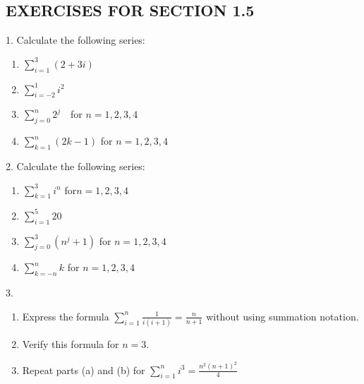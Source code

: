 \documentclass[10pt,]{book}
\theoremstyle{plain}
\theoremstyle{definition}
\begin{document}
\typeout{************************************************}
\typeout{************************************************}
\subsection[EXERCISES FOR SECTION 1.5 ]{EXERCISES FOR SECTION 1.5 }\label{exercises-1.5}
\hypertarget{exercisegroup-9}{}\begin{exercisegroup}
\item[1.]\hypertarget{exercise-32}{} 
Calculate the following series:
\leavevmode%
\begin{enumerate}[label=(\alph*)]
\item\hypertarget{li-175}{}  \(\sum _{i=1}^3 (2 + 3i)\)\item\hypertarget{li-176}{}  \(\sum _{i=-2}^1 i^2\) \item\hypertarget{li-177}{}  \(\sum _{j=0}^n 2^j\text{   }\) for \(n= 1, 2, 3, 4\)\item\hypertarget{li-178}{}  \(\sum _{k=1}^n (2k-1)\) for \(n = 1, 2, 3, 4\) \end{enumerate}
\par\smallskip
\item[2.]\hypertarget{exercise-33}{} Calculate the following series: 
\leavevmode%
\begin{enumerate}[label=(\alph*)]
\item\hypertarget{li-179}{}  \(\sum _{k=1}^3 i^n\) for\(n = 1, 2, 3, 4\) \item\hypertarget{li-180}{}  \(\sum _{i=1}^5 20\) \item\hypertarget{li-181}{}   \(\sum _{j=0}^3 \left(n^j+1\right)\) for \(n = 1, 2, 3,4\) \item\hypertarget{li-182}{}   \(\sum _{k=-n}^n k\) for \(n = 1, 2, 3, 4\) \end{enumerate}
\par\smallskip
\item[3.]\hypertarget{exercise-34}{}\leavevmode%
\begin{enumerate}[label=(\alph*)]
\item\hypertarget{li-183}{}  Express the formula \(\sum _{i=1}^n \frac{1}{i(i+1)}= \frac{n}{n+1}\)  without using summation notation. \item\hypertarget{li-184}{}  Verify this formula for \(n=3\). \item\hypertarget{li-185}{}  Repeat parts (a) and (b) for \(\sum _{i=1}^n i^3=\frac{n^2(n+1)^2}{4}\)\end{enumerate}

\end{exercisegroup}
\end{document}

